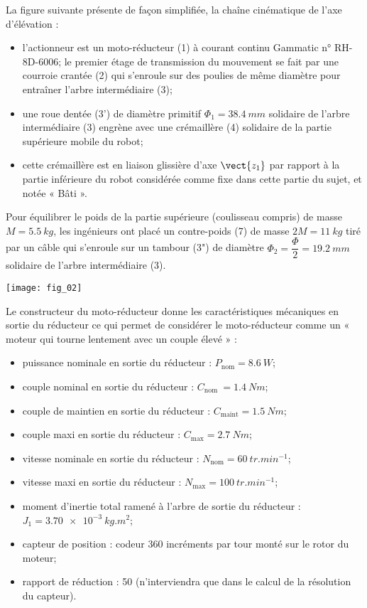 \begin{multicols}{2}
La figure suivante présente de façon simplifiée, la chaîne cinématique de l’axe d’élévation :
\begin{itemize}
\item l’actionneur est un moto-réducteur (1) à courant continu Gammatic n° RH-8D-6006;
le premier étage de transmission du mouvement se fait par une courroie crantée (2) qui s’enroule sur des poulies de même diamètre pour entraîner l’arbre intermédiaire (3);
\item une roue dentée (3’) de diamètre primitif $\Phi_1 = \SI{38,4}{mm}$ solidaire de l’arbre intermédiaire (3) engrène avec une crémaillère (4) solidaire de la partie supérieure mobile du robot;
\item cette crémaillère est en liaison glissière d’axe $\vect{z_1}$ par rapport à la partie inférieure du robot considérée comme fixe dans cette partie du sujet, et notée « Bâti ».
\end{itemize}

Pour équilibrer le poids de la partie supérieure (coulisseau compris) de masse $M = \SI{5,5}{kg}$, les ingénieurs ont placé un contre-poids (7) de masse $2M = \SI{11}{kg}$ tiré par un câble qui s’enroule sur un tambour (3") de diamètre $\Phi_2 = \dfrac{\Phi}{2} = \SI{19,2}{mm}$ solidaire de  l’arbre intermédiaire (3).


\begin{center}
\texttt{[image: fig\_02]}
\end{center}



Le constructeur du moto-réducteur donne les caractéristiques mécaniques en sortie du réducteur  ce qui permet de considérer le moto-réducteur comme un « moteur qui tourne lentement avec un couple élevé » :
\begin{itemize}
\item puissance nominale en sortie du réducteur : $P_{\text{nom}} = \SI{8,6}{W}$;
\item couple nominal en sortie du réducteur : $C_{\text{nom }} = \SI{1,4}{Nm}$;  
\item couple de maintien en sortie du réducteur : $C_{\text{maint}} = \SI{1,5}{Nm}$;
\item couple maxi en sortie du réducteur : $C_{\text{max}}	= \SI{2,7}{Nm}$;
\item vitesse nominale en sortie du réducteur : $N_{\text{nom}} = \SI{60}{tr.min^{-1}}$;
\item vitesse maxi en sortie du réducteur : $N_{\text{max}} = \SI{100}{tr.min^{-1}}$;
\item moment d’inertie total ramené à l’arbre de sortie du réducteur : $J_1 = \SI{3,70e-3}{kg.m^2}$; 
\item capteur de position : codeur 360 incréments par tour monté sur le rotor du moteur;
\item rapport de réduction : 50 (n’interviendra que dans le calcul de la résolution du capteur).
\end{itemize}
\fi


\end{multicols}
